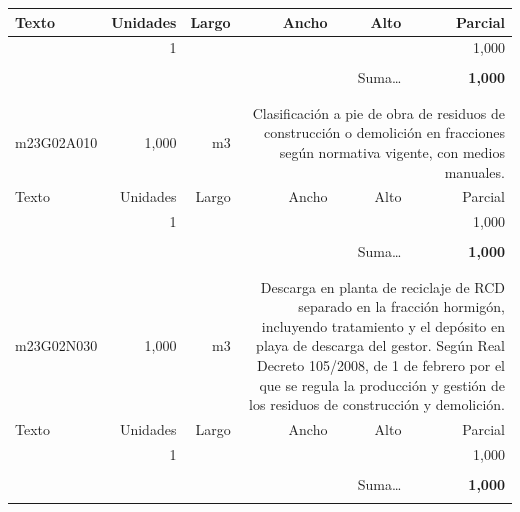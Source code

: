 \documentclass{book}%
\begin{document}
\begin{longtable}{lrrrrr}
Texto&Unidades&Largo&Ancho&Alto&Parcial\\%
\hline%
\multicolumn{1}{p{3.5cm}}{ }&1&&&&     1,000\\%
&&&&&\\%
\multicolumn{5}{r}{Suma\ldots}&\textbf{     1,000}\\%
\hline%
&&&&&\\%
&&&&&\\%
m23G02A010&     1,000& m3&\multicolumn{3}{p{6cm}}{\scriptsize Clasificación a pie de obra de residuos de construcción o demolición en fracciones según normativa vigente, con medios manuales.\normalsize}\\%
Texto&Unidades&Largo&Ancho&Alto&Parcial\\%
\hline%
\multicolumn{1}{p{3.5cm}}{ }&1&&&&     1,000\\%
&&&&&\\%
\multicolumn{5}{r}{Suma\ldots}&\textbf{     1,000}\\%
\hline%
&&&&&\\%
&&&&&\\%
m23G02N030&     1,000& m3&\multicolumn{3}{p{6cm}}{\scriptsize Descarga en planta de reciclaje de RCD separado en la fracción hormigón, incluyendo tratamiento y el depósito en playa de descarga del gestor. Según Real Decreto 105/2008, de 1 de febrero por el que se regula la producción y gestión de los residuos de construcción y demolición.\normalsize}\\%
Texto&Unidades&Largo&Ancho&Alto&Parcial\\%
\hline%
\multicolumn{1}{p{3.5cm}}{ }&1&&&&     1,000\\%
&&&&&\\%
\multicolumn{5}{r}{Suma\ldots}&\textbf{     1,000}\\%
\hline%
&&&&&\\%
\end{longtable}%
\newpage

%
\end{document}
